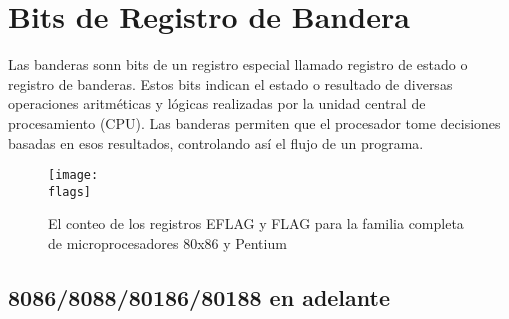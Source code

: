 	\clearpage
	\section{Bits de Registro de Bandera}

	Las banderas sonn bits de un registro especial llamado registro de estado o registro de
	banderas. Estos bits indican el estado o resultado de diversas operaciones aritméticas
	y lógicas realizadas por la unidad central de procesamiento (CPU). Las banderas permiten
	que el procesador tome decisiones basadas en esos resultados, controlando así el flujo
	de un programa.

	\begin{figure}[h]
		\centering
		\texttt{[image: \\flags]}
		\caption{El conteo de los registros EFLAG y FLAG para la familia completa de
		microprocesadores 80x86 y Pentium}
	\end{figure}

	\subsection{8086/8088/80186/80188 en adelante}

